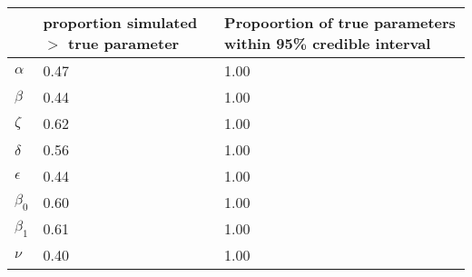 \begin{table}[ht]
\centering
\begin{tabular}{lp{1.5in}p{1.5in}}
  \hline
 & proportion simulated $>$ true parameter & Propoortion of true parameters 
 within 95\% credible interval \\ 
  \hline
$\alpha$ & 0.47 & 1.00 \\ 
  $\beta$ & 0.44 & 1.00 \\ 
  $\zeta$ & 0.62 & 1.00 \\ 
  $\delta$ & 0.56 & 1.00 \\ 
  $\epsilon$ & 0.44 & 1.00 \\ 
  $\beta_0$ & 0.60 & 1.00 \\ 
  $\beta_1$ & 0.61 & 1.00 \\ 
  $\nu$ & 0.40 & 1.00 \\ 
   \hline
\end{tabular}
\end{table}
